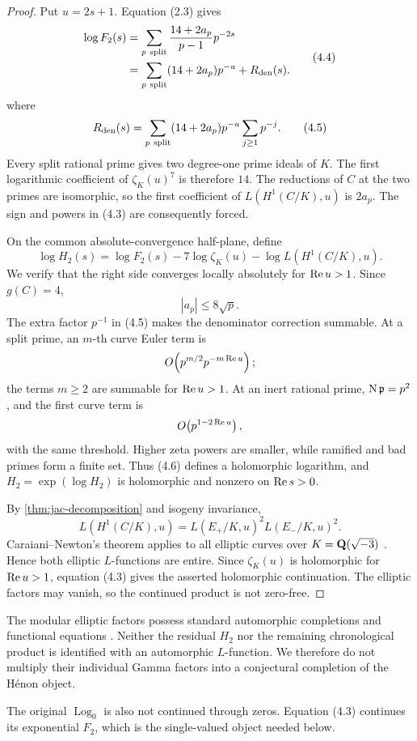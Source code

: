 \begin{proof}
Put \(u=2s+1\).  Equation (2.3) gives
\[
\begin{aligned}
 \log F_2(s)
 &=\sum_{p\ {\rm split}}
   \frac{14+2a_p}{p-1}p^{-2s}\\
 &=\sum_{p\ {\rm split}}(14+2a_p)p^{-u}
   +R_{\mathrm{den}}(s).
\end{aligned}                                           \tag{4.4}
\]
where
\[
 R_{\mathrm{den}}(s)
 =\sum_{p\ {\rm split}}(14+2a_p)p^{-u}
   \sum_{j\ge1}p^{-j}.                                 \tag{4.5}
\]
Every split rational prime gives two degree-one prime ideals of \(K\).
The first logarithmic coefficient of \(\zeta_K(u)^7\) is therefore \(14\).
The reductions of \(C\) at the two primes are isomorphic, so the first
coefficient of \(L(H^1(C/K),u)\) is \(2a_p\).  The sign and powers in
(4.3) are consequently forced.

On the common absolute-convergence half-plane, define
\[
 \log H_2(s)=
 \log F_2(s)-7\log\zeta_K(u)-\log L(H^1(C/K),u).
                                                               \tag{4.6}
\]
We verify that the right side converges locally absolutely for
\(\operatorname{Re} u>1\).  Since \(g(C)=4\),
\[
 |a_p|\le8\sqrt p.
\]
The extra factor \(p^{-1}\) in (4.5) makes the denominator correction
summable.  At a split prime, an \(m\)-th curve Euler term is
\[
 O\!\left(p^{m/2}p^{-m\operatorname{Re} u}\right);
\]
the terms \(m\ge2\) are summable for \(\operatorname{Re} u>1\).  At an inert
rational prime, \(\operatorname{N}\mathfrak p=p^2\), and the first curve term is
\[
 O\!\left(p^{1-2\operatorname{Re} u}\right),
\]
with the same threshold.  Higher zeta powers are smaller, while ramified
and bad primes form a finite set.  Thus (4.6) defines a holomorphic
logarithm, and \(H_2=\exp(\log H_2)\) is holomorphic and nonzero on
\(\operatorname{Re} s>0\).

By \cref{thm:jac-decomposition} and isogeny invariance,
\[
 L(H^1(C/K),u)=L(E_+/K,u)^2L(E_-/K,u)^2.                \tag{4.7}
\]
Caraiani--Newton's theorem applies to all elliptic curves over
\(K=\mathbf Q(\sqrt{-3})\) \cite[Theorem~1.1 and the examples immediately
following it]{CaraianiNewton2025}.  Hence both elliptic \(L\)-functions are
entire.  Since \(\zeta_K(u)\) is holomorphic for \(\operatorname{Re} u>1\), equation
(4.3) gives the asserted holomorphic continuation.  The elliptic factors
may vanish, so the continued product is not zero-free.
\end{proof}

\begin{remark}\label{rem:fe-firewall}
The modular elliptic factors possess standard automorphic completions and
functional equations \cite[Global Theory]{GodementJacquet1972}.  Neither
the residual \(H_2\) nor the remaining chronological product is identified
with an automorphic \(L\)-function.  We therefore do not multiply their
individual Gamma factors into a conjectural completion of the H\'enon
object.

The original \(\operatorname{Log}_0\) is also not continued through zeros.
Equation (4.3) continues its exponential \(F_2\), which is the
single-valued object needed below.
\end{remark}
